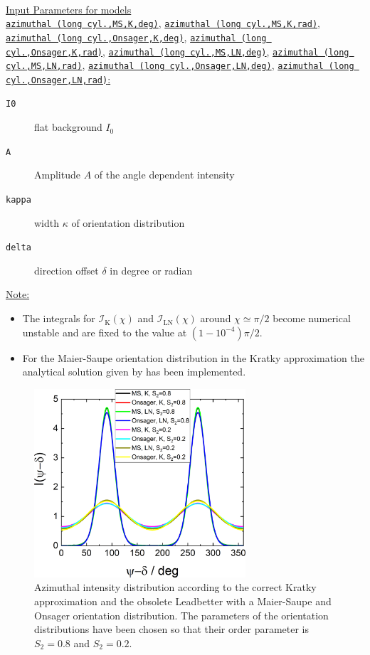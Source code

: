 \hspace{1pt}\\
\underline{Input Parameters for models} \\
\underline{\texttt{azimuthal (long cyl.,MS,K,deg)}}, \underline{\texttt{azimuthal (long cyl.,MS,K,rad)}}, \underline{\texttt{azimuthal (long cyl.,Onsager,K,deg)}}, \underline{\texttt{azimuthal (long cyl.,Onsager,K,rad)}}, \underline{\texttt{azimuthal (long cyl.,MS,LN,deg)}}, \underline{\texttt{azimuthal (long cyl.,MS,LN,rad)}}, \underline{\texttt{azimuthal (long cyl.,Onsager,LN,deg)}}, \underline{\texttt{azimuthal (long cyl.,Onsager,LN,rad)}:}\\
\begin{description}
\item[\texttt{I0}] flat background $I_0$
\item[\texttt{A}] Amplitude $A$ of the angle dependent intensity
\item[\texttt{kappa}] width $\kappa$ of orientation distribution
\item[\texttt{delta}] direction offset $\delta$ in degree or radian
\end{description}

\newpage
\noindent \underline{Note:}
\begin{itemize}
  \item The integrals for $\mathcal{I}_\mathrm{K}(\chi)$ and $\mathcal{I}_\mathrm{LN}(\chi)$ around $\chi\simeq\pi/2$ become numerical unstable and are fixed to the value at $(1-10^{-4})\pi/2$.
  \item For the Maier-Saupe orientation distribution in the Kratky approximation the analytical solution given by \cite{Mills2008} has been implemented.
\end{itemize}

\begin{figure}[htb]
\begin{center}
\includegraphics[width=0.7\textwidth]{../images/form_factor/azimuthal/azimuthal_long_cylinder.png}
\end{center}
\caption{Azimuthal intensity distribution according to the correct Kratky approximation and the obsolete Leadbetter with a Maier-Saupe and Onsager orientation distribution. The parameters of the orientation distributions have been chosen so that their order parameter is $S_2=0.8$ and $S_2=0.2$.}
\label{fig:azimuthal_long_cylinder}
\end{figure}

